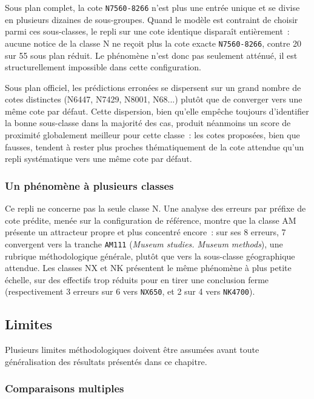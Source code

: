 Sous plan complet, la cote \texttt{N7560-8266} n'est plus une entrée unique et se divise en plusieurs dizaines de sous-groupes. Quand le modèle est contraint de choisir parmi ces sous-classes, le repli sur une cote identique disparaît entièrement~: aucune notice de la classe N ne reçoit plus la cote exacte \texttt{N7560-8266}, contre 20 sur 55 sous plan réduit. Le phénomène n'est donc pas seulement atténué, il est structurellement impossible dans cette configuration.

Sous plan officiel, les prédictions erronées se dispersent sur un grand nombre de cotes distinctes (N6447, N7429, N8001, N68...) plutôt que de converger vers une même cote par défaut. Cette dispersion, bien qu'elle empêche toujours d'identifier la bonne sous-classe dans la majorité des cas, produit néanmoins un score de proximité globalement meilleur pour cette classe~: les cotes proposées, bien que fausses, tendent à rester plus proches thématiquement de la cote attendue qu'un repli systématique vers une même cote par défaut.

\subsubsection*{Un phénomène à plusieurs classes}

Ce repli ne concerne pas la seule classe N. Une analyse des erreurs par préfixe de cote prédite, menée sur la configuration de référence, montre que la classe AM présente un attracteur propre et plus concentré encore~: sur ses 8 erreurs, 7 convergent vers la tranche \texttt{AM111} (\textit{Museum studies. Museum methods}), une rubrique méthodologique générale, plutôt que vers la sous-classe géographique attendue. Les classes NX et NK présentent le même phénomène à plus petite échelle, sur des effectifs trop réduits pour en tirer une conclusion ferme (respectivement 3 erreurs sur 6 vers \texttt{NX650}, et 2 sur 4 vers \texttt{NK4700}).

\subsection{Limites}
\label{sec:limites}

Plusieurs limites méthodologiques doivent être assumées avant toute généralisation des résultats présentés dans ce chapitre.

\subsubsection*{Comparaisons multiples}

